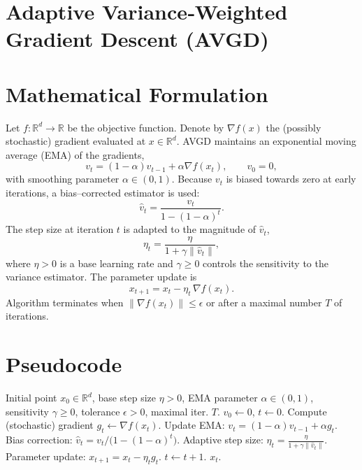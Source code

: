 \documentclass{article}
\newcommand{\R}{\mathbb{R}}
\begin{document}
\section*{Adaptive Variance‑Weighted Gradient Descent (AVGD)}

\section*{Mathematical Formulation}
Let $f:\R^{d}\to\R$ be the objective function.  
Denote by $\nabla f(x)$ the (possibly stochastic) gradient evaluated at $x\in\R^{d}$.  
AVGD maintains an exponential moving average (EMA) of the gradients,
\begin{equation}
    v_{t}= (1-\alpha)v_{t-1}+ \alpha \nabla f(x_{t}),\qquad v_{0}=0,
    \label{eq:ema}
\end{equation}
with smoothing parameter $\alpha\in(0,1)$.  
Because $v_{t}$ is biased towards zero at early iterations, a bias–corrected estimator is used:
\begin{equation}
    \widehat v_{t}= \frac{v_{t}}{1-(1-\alpha)^{t}} .
    \label{eq:bias}
\end{equation}
The step size at iteration $t$ is adapted to the magnitude of $\widehat v_{t}$,
\begin{equation}
    \eta_{t}= \frac{\eta}{1+\gamma\|\widehat v_{t}\|},
    \label{eq:stepsize}
\end{equation}
where $\eta>0$ is a base learning rate and $\gamma\ge 0$ controls the sensitivity to the variance estimator.  
The parameter update is
\begin{equation}
    x_{t+1}= x_{t} - \eta_{t}\,\nabla f(x_{t}).
    \label{eq:update}
\end{equation}
Algorithm terminates when $\|\nabla f(x_{t})\|\le\epsilon$ or after a maximal number $T$ of iterations.

\section*{Pseudocode}
\begin{algorithm}[H]
\caption{Adaptive Variance‑Weighted Gradient Descent (AVGD)}
\begin{algorithmic}[1]
\REQUIRE Initial point $x_{0}\in\R^{d}$, base step size $\eta>0$, EMA parameter $\alpha\in(0,1)$,
        sensitivity $\gamma\ge0$, tolerance $\epsilon>0$, maximal iter. $T$.
\STATE $v_{0}\gets 0$, $t\gets 0$.
    \STATE Compute (stochastic) gradient $g_{t}\gets \nabla f(x_{t})$.
    \STATE Update EMA: $v_{t}= (1-\alpha)v_{t-1}+ \alpha g_{t}$.
    \STATE Bias correction: $\widehat v_{t}= v_{t}/\bigl(1-(1-\alpha)^{t}\bigr)$.
    \STATE Adaptive step size: $\displaystyle \eta_{t}= \frac{\eta}{1+\gamma\|\widehat v_{t}\|}$.
    \STATE Parameter update: $x_{t+1}= x_{t}-\eta_{t} g_{t}$.
    \STATE $t\gets t+1$.
\ENDWHILE
\RETURN $x_{t}$.
\end{algorithmic}
\end{algorithm}
\end{document}
